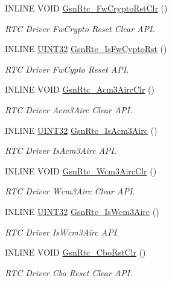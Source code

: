 \begin{DoxyCompactItemize}
INLINE VOID \hyperlink{a00651_ga69571c7ee93a3ed18f576557ea11b910}{GsnRtc\_\-FwCryptoRstClr} ()
\begin{DoxyCompactList}\small\item\em RTC Driver FwCrypto Reset Clear API. \end{DoxyCompactList}\item 
INLINE \hyperlink{a00660_gae1e6edbbc26d6fbc71a90190d0266018}{UINT32} \hyperlink{a00651_ga1da3332c034dc38aadd907988b6d9042}{GsnRtc\_\-IsFwCyptoRst} ()
\begin{DoxyCompactList}\small\item\em RTC Driver FwCypto Reset API. \end{DoxyCompactList}\item 
INLINE VOID \hyperlink{a00651_gad04bf17aa8b0e9b43f4634141f96cad8}{GsnRtc\_\-Acm3AircClr} ()
\begin{DoxyCompactList}\small\item\em RTC Driver Acm3Airc Clear API. \end{DoxyCompactList}\item 
INLINE \hyperlink{a00660_gae1e6edbbc26d6fbc71a90190d0266018}{UINT32} \hyperlink{a00651_ga5c05ee5001b9f01bbc6a53013e19ad45}{GsnRtc\_\-IsAcm3Airc} ()
\begin{DoxyCompactList}\small\item\em RTC Driver IsAcm3Airc API. \end{DoxyCompactList}\item 
INLINE VOID \hyperlink{a00651_ga632c40dd335598894425055eea63c026}{GsnRtc\_\-Wcm3AircClr} ()
\begin{DoxyCompactList}\small\item\em RTC Driver Wcm3Airc Clear API. \end{DoxyCompactList}\item 
INLINE \hyperlink{a00660_gae1e6edbbc26d6fbc71a90190d0266018}{UINT32} \hyperlink{a00651_ga58b4ca2b64aa5c74b2b37b4d11b1bf18}{GsnRtc\_\-IsWcm3Airc} ()
\begin{DoxyCompactList}\small\item\em RTC Driver IsWcm3Airc API. \end{DoxyCompactList}\item 
INLINE VOID \hyperlink{a00651_ga3365cb4710337f2a1c7bd6659a5d5f41}{GsnRtc\_\-CboRstClr} ()
\begin{DoxyCompactList}\small\item\em RTC Driver Cbo Reset Clear API. \end{DoxyCompactList}\item 

\end{DoxyCompactItemize}
